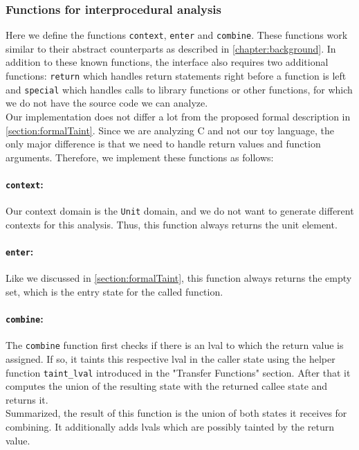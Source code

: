       \subsubsection{Functions for interprocedural analysis}
        Here we define the functions \texttt{context}, \texttt{enter} and \texttt{combine}. These functions work similar to their abstract counterparts as described in \autoref{chapter:background}. In addition to these known functions, the interface also requires two additional functions: \texttt{return} which handles return statements right before a function is left and \texttt{special} which handles calls to library functions or other functions, for which we do not have the source code we can analyze.\\
        Our implementation does not differ a lot from the proposed formal description in \autoref{section:formalTaint}. Since we are analyzing C and not our toy language, the only major difference is that we need to handle return values and function arguments. Therefore, we implement these functions as follows:

          \paragraph{\texttt{context}:} Our context domain is the \texttt{Unit} domain, and we do not want to generate different contexts for this analysis. Thus, this function always returns the unit element. 

          \paragraph{\texttt{enter}:} Like we discussed in \autoref{section:formalTaint}, this function always returns the empty set, which is the entry state for the called function.

          \paragraph{\texttt{combine}:} The \texttt{combine} function first checks if there is an \ac{lval} to which the return value is assigned. If so, it taints this respective \ac{lval} in the caller state using the helper function \texttt{taint\_lval} introduced in the "Transfer Functions" section. After that it computes the union of the resulting state with the returned callee state and returns it.\\
          Summarized, the result of this function is the union of both states it receives for combining. It additionally adds \ac{lval}s which are possibly tainted by the return value.

